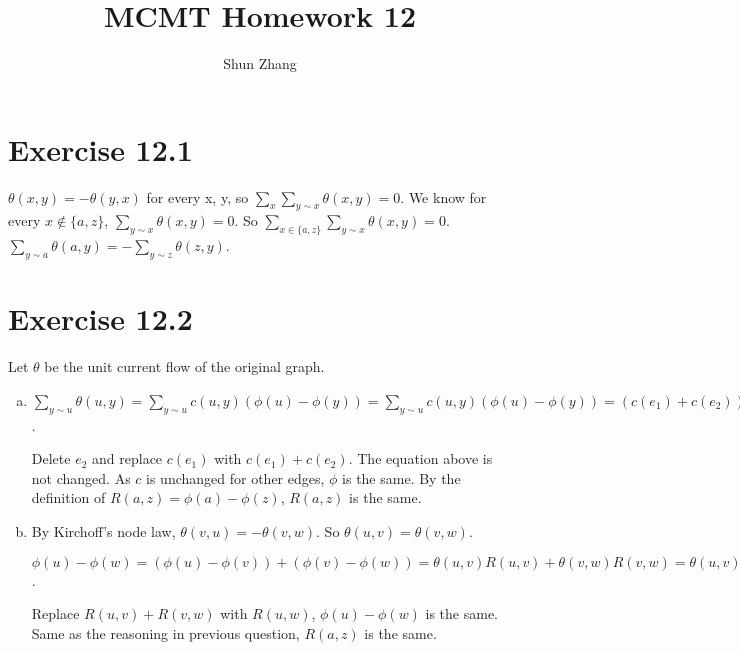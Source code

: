 \documentclass[10pt]{article}
\title{MCMT Homework 12}
\author{Shun Zhang}
\date{}
\begin{document}
\maketitle

\section*{Exercise 12.1}
$\theta(x, y) = -\theta(y, x)$ for every x, y, so $\sum_x \sum_{y \sim x}
\theta(x, y) = 0$. We know for every $x \not\in \{a,z\}$, $\sum_{y \sim x}
\theta(x,y)=0$. So $\sum_{x \in \{a, z\}} \sum_{y \sim x} \theta(x, y) = 0$. 
$\sum_{y \sim a} \theta(a,y)= -\sum_{y \sim z} \theta(z,y)$.

\section*{Exercise 12.2}
Let $\theta$ be the unit current flow of the original graph.

\begin{enumerate}[(a)]
\item
$\sum_{y \sim u} \theta(u, y) =
\sum_{y \sim u} c(u, y) (\phi(u) - \phi(y)) =
\sum_{y \sim u} c(u, y) (\phi(u) - \phi(y)) =
(c(e_1) + c(e_2)) (\phi(u) - \phi(v)) + \sum_{y \sim u \setminus \{e_1, e_2\}}
c(u, y) (\phi(u) - \phi(y)) = 0
$.

Delete $e_2$ and replace $c(e_1)$ with $c(e_1)+c(e_2)$. The equation above is
not changed. As $c$ is unchanged for other edges, $\phi$ is the same. By the
definition of $R(a, z) = \phi(a) - \phi(z)$, $R(a, z)$ is the same.

\item
By Kirchoff’s node law, $\theta(v, u) = - \theta(v, w)$. So $\theta(u, v) =
\theta(v, w)$.

$\phi(u) - \phi(w) = (\phi(u) - \phi(v)) + (\phi(v) - \phi(w)) = \theta(u, v)
R(u, v) + \theta(v, w) R(v, w) = \theta(u, v) (R(u, v) + R(v, w))$.

Replace $R(u, v) + R(v, w)$ with $R(u, w)$, $\phi(u) - \phi(w)$ is the same.
Same as the reasoning in previous question, $R(a, z)$ is the same.
\end{enumerate}
\end{document}
